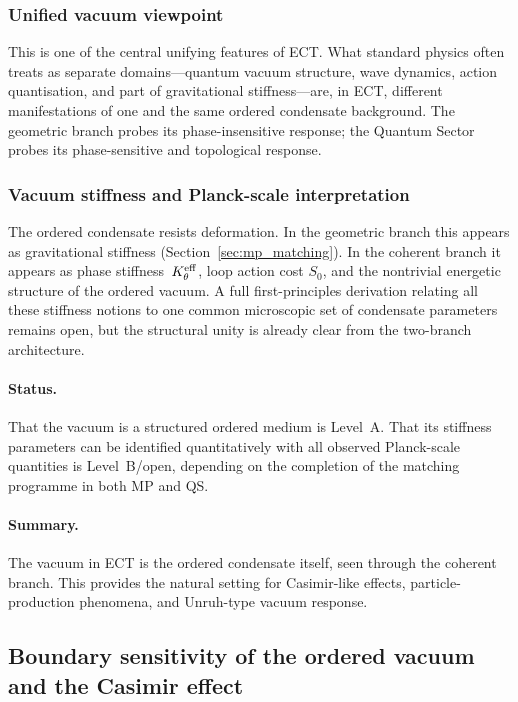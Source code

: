 \documentclass[11pt,a4paper]{article}
\numberwithin{equation}{section}
\begin{document}
\subsubsection*{Unified vacuum viewpoint}

This is one of the central unifying features of ECT.
What standard physics often treats as separate domains---quantum vacuum
structure, wave dynamics, action quantisation, and part of
gravitational stiffness---are, in ECT, different manifestations of one
and the same ordered condensate background.
The geometric branch probes its phase-insensitive response;
the Quantum Sector probes its phase-sensitive and topological response.

\subsubsection*{Vacuum stiffness and Planck-scale interpretation}

The ordered condensate resists deformation.
In the geometric branch this appears as gravitational stiffness
(Section~\ref{sec:mp_matching}).
In the coherent branch it appears as phase stiffness~$K_\theta^{\rm eff}$,
loop action cost $S_0$, and the nontrivial energetic structure of the
ordered vacuum.
A full first-principles derivation relating all these stiffness notions
to one common microscopic set of condensate parameters remains open,
but the structural unity is already clear from the two-branch
architecture.

\paragraph{Status.}
That the vacuum is a structured ordered medium is Level~A.
That its stiffness parameters can be identified quantitatively with
all observed Planck-scale quantities is Level~B/open, depending on
the completion of the matching programme in both MP and QS.

\paragraph{Summary.}
The vacuum in ECT is the ordered condensate itself, seen through the
coherent branch.
This provides the natural setting for Casimir-like effects,
particle-production phenomena, and Unruh-type vacuum response.

\subsection{Boundary sensitivity of the ordered vacuum and the Casimir effect}
\label{sec:qs_casimir}
\label{sec:casimir}
\end{document}
